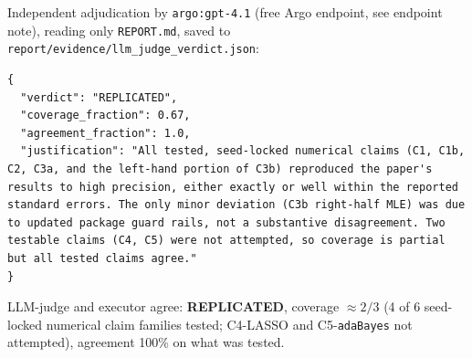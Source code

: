 \documentclass[11pt]{article}
\begin{document}
Independent adjudication by \texttt{argo:gpt-4.1} (free Argo endpoint,
see endpoint note), reading only \texttt{REPORT.md}, saved to
\texttt{report/evidence/llm\_judge\_verdict.json}:
\begin{lstlisting}
{
  "verdict": "REPLICATED",
  "coverage_fraction": 0.67,
  "agreement_fraction": 1.0,
  "justification": "All tested, seed-locked numerical claims (C1, C1b, C2, C3a, and the left-hand portion of C3b) reproduced the paper's results to high precision, either exactly or well within the reported standard errors. The only minor deviation (C3b right-half MLE) was due to updated package guard rails, not a substantive disagreement. Two testable claims (C4, C5) were not attempted, so coverage is partial but all tested claims agree."
}
\end{lstlisting}

LLM-judge and executor agree: \textbf{REPLICATED}, coverage $\approx 2/3$
(4 of 6 seed-locked numerical claim families tested; C4-LASSO and
C5-\texttt{adaBayes} not attempted), agreement 100\% on what was tested.
\end{document}
